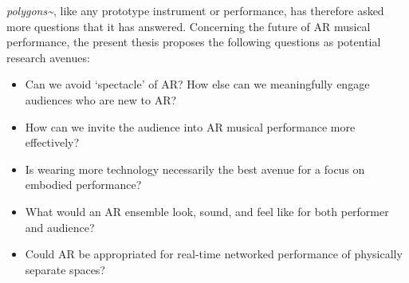 \textit{polygons\textasciitilde{}}, like any prototype instrument or performance, has therefore asked more questions that it has answered. Concerning the future of AR musical performance, the present thesis proposes the following questions as potential research avenues:
\begin{itemize}
    \item Can we avoid `spectacle' of AR? How else can we meaningfully engage audiences who are new to AR?
    \item How can we invite the audience into AR musical performance more effectively?
    \item Is wearing more technology necessarily the best avenue for a focus on embodied performance?
    \item What would an AR ensemble look, sound, and feel like for both performer and audience?
    \item Could AR be appropriated for real-time networked performance of physically separate spaces?
\end{itemize}